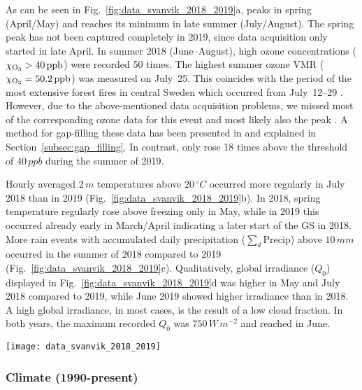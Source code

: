 \documentclass[bg, manuscript]{copernicus}
\begin{document}
As can be seen in Fig.~\ref{fig:data_svanvik_2018_2019}a,  peaks in spring (April/May) and reaches its minimum in late summer (July/August). The spring peak has not been captured completely in 2019, since data acquisition only started in late April. In summer 2018 (June--August), high ozone concentrations ($\chem{\chi_{O_3}} > 40\,\unit{ppb}$) were recorded 50 times. The highest summer ozone VMR ($\chem{\chi_{O_3}} = 50.2\,\unit{ppb}$) was measured on July~25. This coincides with the period of the most extensive forest fires in central Sweden which occurred from July~12--29 \citep{SOU2019}. However, due to the above-mentioned data acquisition problems, we missed most of the corresponding ozone data for this event and most likely also the peak . A method for gap-filling these data has been presented in \citet{ACP:Falk2021} and explained in Section~\ref{subsec:gap_filling}. In contrast,  only rose 18 times above the threshold of $40\,\unit{ppb}$ during the summer of 2019. 

Hourly averaged $2\,\unit{m}$ temperatures above $20\,\unit{^\circ C}$ occurred more regularly in July 2018 than in 2019 (Fig.~\ref{fig:data_svanvik_2018_2019}b). In 2018, spring temperature regularly rose above freezing only in May, while in 2019 this occurred already early in March/April indicating a later start of the GS in 2018.
More rain events with accumulated daily precipitation ($\sum_d \mathrm{Precip}$) above $10\,\unit{mm}$ occurred in the summer of 2018 compared to 2019 (Fig.~\ref{fig:data_svanvik_2018_2019}c).
Qualitatively, global irradiance ($Q_0$) displayed in Fig.~\ref{fig:data_svanvik_2018_2019}d was higher in May and July 2018 compared to 2019, while June 2019 showed higher irradiance than in 2018. A high global irradiance, in most cases, is the result of a low cloud fraction. In both years, the maximum recorded $Q_0$ was $750\,\unit{W\,m^{-2}}$ and reached in June.

\begin{figure*}[t]
  \texttt{[image: data\_svanvik\_2018\_2019]}
  \caption{Observational data from atmospheric monitoring at Svanhovd in 2018/19. The hatched areas indicate periods without ozone monitoring data. (a) Hourly averaged ozone VMR; (b) hourly averaged temperature; (c) daily accumulated precipitation; (d) hourly averaged global irradiance.}
  \label{fig:data_svanvik_2018_2019}
\end{figure*}


\subsubsection{Climate (1990-present)}
\label{subsec:climatologies}
\end{document}
